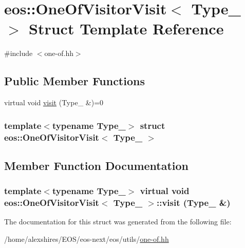 \hypertarget{structeos_1_1OneOfVisitorVisit}{
\section{eos::OneOfVisitorVisit$<$ Type\_\- $>$ Struct Template Reference}
\label{structeos_1_1OneOfVisitorVisit}
}


{\ttfamily \#include $<$one-\/of.hh$>$}\subsection*{Public Member Functions}
\begin{DoxyCompactItemize}
\item 
virtual void \hyperlink{structeos_1_1OneOfVisitorVisit_a08f9e17fa9f510ba6171d6b191e76a9b}{visit} (Type\_\- \&)=0
\end{DoxyCompactItemize}
\subsubsection*{template$<$typename Type\_\-$>$ struct eos::OneOfVisitorVisit$<$ Type\_\- $>$}



\subsection{Member Function Documentation}
\hypertarget{structeos_1_1OneOfVisitorVisit_a08f9e17fa9f510ba6171d6b191e76a9b}{
\subsubsection[{visit}]{\setlength{\rightskip}{0pt plus 5cm}template$<$typename Type\_\-$>$ virtual void {\bf eos::OneOfVisitorVisit}$<$ Type\_\- $>$::visit (Type\_\- \&)}}
\label{structeos_1_1OneOfVisitorVisit_a08f9e17fa9f510ba6171d6b191e76a9b}


The documentation for this struct was generated from the following file:\begin{DoxyCompactItemize}
\item 
/home/alexshires/EOS/eos-\/next/eos/utils/\hyperlink{one-of_8hh}{one-\/of.hh}\end{DoxyCompactItemize}
